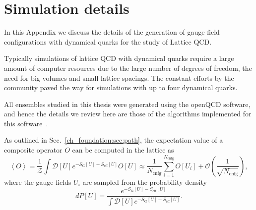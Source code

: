
\chapter{Simulation details}
\label{appex_simulations}

In this Appendix we discuss the details of the generation of gauge field configurations with dynamical quarks for the study of Lattice QCD. 

Typically simulations of lattice QCD with dynamical quarks require a large amount of computer resources due to the large number of degrees of freedom, the need for big volumes and small lattice spacings. The constant efforts by the community paved the way for simulations with up to four dynamical quarks. 

All ensembles studied in this thesis were generated using the openQCD software, and hence the details we review here are those of the algorithms implemented for this software~\citep{Luscher:2012av,Luscher:2010ae}.

As outlined in Sec.~\ref{ch_foundation:sec:path}, the expectation value of a composite operator $O$ can be computed in the lattice as
\begin{equation}
\left<O\right>=\frac{1}{\mathcal{Z}}\int\mathcal{D}[U]e^{-S_{\textrm{G}}[U]-S_{\textrm{eff}}[U]}O[U]\approx\frac{1}{N_{\textrm{cnfg}}}\sum_{i=1}^{N_{\textrm{cnfg}}}O[U_i]+\mathcal{O}\left(\frac{1}{\sqrt{N_{\textrm{cnfg}}}}\right),
\end{equation}
where the gauge fields $U_i$ are sampled from the probability density
\begin{equation}
\label{appex_simulations:eq:PU}
dP[U]=\frac{e^{-S_{\textrm{G}}[U]-S_{\textrm{eff}}[U]}}{\int\mathcal{D}[U]e^{-S_{\textrm{G}}[U]-S_{\textrm{eff}}[U]}}.
\end{equation}

